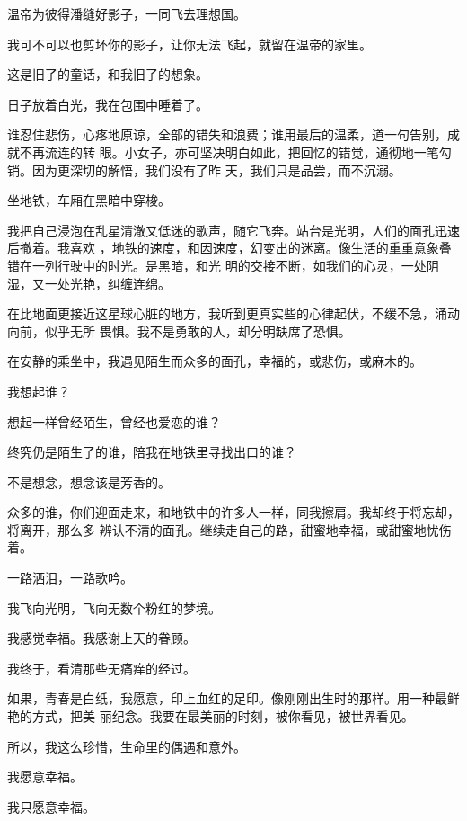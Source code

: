 \documentclass[12pt,a4paper]{article}
\begin{document}
		温帝为彼得潘缝好影子，一同飞去理想国。

		我可不可以也剪坏你的影子，让你无法飞起，就留在温帝的家里。

		这是旧了的童话，和我旧了的想象。

		日子放着白光，我在包围中睡着了。

	\endwriting



		谁忍住悲伤，心疼地原谅，全部的错失和浪费；谁用最后的温柔，道一句告别，成就不再流连的转
	眼。小女子，亦可坚决明白如此，把回忆的错觉，通彻地一笔勾销。因为更深切的解悟，我们没有了昨
	天，我们只是品尝，而不沉溺。

		坐地铁，车厢在黑暗中穿梭。

		我把自己浸泡在乱星清澈又低迷的歌声，随它飞奔。站台是光明，人们的面孔迅速后撤着。我喜欢
	，地铁的速度，和因速度，幻变出的迷离。像生活的重重意象叠错在一列行驶中的时光。是黑暗，和光
	明的交接不断，如我们的心灵，一处阴湿，又一处光艳，纠缠连绵。

		在比地面更接近这星球心脏的地方，我听到更真实些的心律起伏，不缓不急，涌动向前，似乎无所
	畏惧。我不是勇敢的人，却分明缺席了恐惧。

		在安静的乘坐中，我遇见陌生而众多的面孔，幸福的，或悲伤，或麻木的。

		我想起谁？\par
		想起一样曾经陌生，曾经也爱恋的谁？\par
		终究仍是陌生了的谁，陪我在地铁里寻找出口的谁？\par
		不是想念，想念该是芳香的。

		众多的谁，你们迎面走来，和地铁中的许多人一样，同我擦肩。我却终于将忘却，将离开，那么多
	辨认不清的面孔。继续走自己的路，甜蜜地幸福，或甜蜜地忧伤着。

		一路洒泪，一路歌吟。\par
		我飞向光明，飞向无数个粉红的梦境。\par
		我感觉幸福。我感谢上天的眷顾。\par
		我终于，看清那些无痛痒的经过。

		如果，青春是白纸，我愿意，印上血红的足印。像刚刚出生时的那样。用一种最鲜艳的方式，把美
	丽纪念。我要在最美丽的时刻，被你看见，被世界看见。

		所以，我这么珍惜，生命里的偶遇和意外。

		我愿意幸福。

		我只愿意幸福。

	\endwriting


\end{document}
